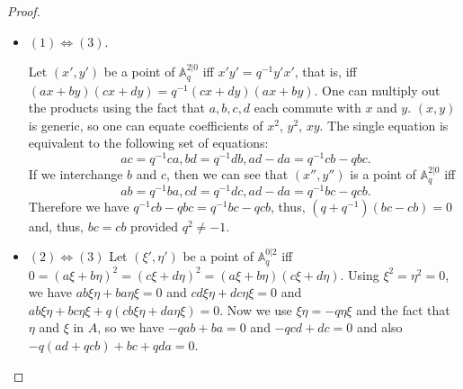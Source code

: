 \documentclass[8pt]{article}
\theoremstyle{definition}
\theoremstyle{definition}
\theoremstyle{definition}
\theoremstyle{definition}
\theoremstyle{definition}
\theoremstyle{definition}
\theoremstyle{definition}
\theoremstyle{definition}
\theoremstyle{definition}
\theoremstyle{definition}
\theoremstyle{definition}
\theoremstyle{definition}
\theoremstyle{definition}
\theoremstyle{definition}
\theoremstyle{question}
\begin{document}
\begin{proof}
  $ $
\begin{itemize}
  \item $(1) \Leftrightarrow (3)$.

  Let $(x', y')$ be a point of $\mathbb{A}^{2|0}_q$ iff $x'y' = q^{-1} y'x'$, that is,
  iff $(a x + b y)(c x + d y) = q^{-1}(cx + d y)(ax + by)$. One can multiply out the products
  using the fact that $a, b, c, d$ each commute with $x$ and $y$. $(x, y)$ is generic,
  so one can equate coefficients of $x^2$, $y^2$, $x y$. The single equation is equivalent
  to the following set of equations:
  \begin{equation}~\label{equations:1}
    a c = q^{-1} c a, b d = q^{-1} d b, a d - d a = q^{-1} c b - q b c.
  \end{equation}
  If we interchange $b$ and $c$, then we can see that $(x'', y'')$ is a point 
  of $\mathbb{A}^{2|0}_q$ iff
  \begin{equation}~\label{equations:2}
    a b = q^{-1} b a, c d = q^{-1} d c, a d - d a = q^{-1} b c - q c b.
  \end{equation}
  Therefore we have $q^{-1} c b - q b c = q^{-1} b c - q c b$, thus, 
  $(q + q^{-1})(b c - c b) = 0$ and, thus, $b c = c b$ provided $q^2 \neq - 1$.
  \item $(2) \Leftrightarrow (3)$ Let $(\xi', \eta')$ be a point of $\mathbb{A}^{0|2}_q$
  iff $0 = (a \xi + b \eta)^2 = (c \xi + d \eta)^2 = (a \xi + b \eta)(c \xi + d \eta)$.
  Using $\xi^2 = \eta^2 = 0$, we have $a b \xi \eta + b a \eta \xi = 0$ and 
  $c d \xi \eta + d c \eta \xi = 0$ and $a b \xi \eta + b c \eta \xi + q(cb \xi \eta + d a \eta \xi) = 0$.
  Now we use $\xi \eta = - q \eta \xi$ and the fact that $\eta$ and $\xi$ in $A$,
  so we have $-q a b + b a = 0$ and $-q c d+ dc = 0$ and also $-q (a d + q cb) + b c + q da = 0$.
\end{itemize}
\end{proof}
\end{document}
